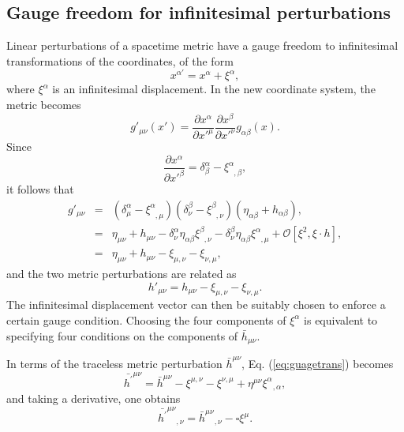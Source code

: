 \documentclass[12pt]{article}
\begin{document}
{\subsection{Gauge freedom for infinitesimal perturbations}Linear perturbations of a spacetime metric have a gauge freedom to infinitesimal transformations of the coordinates,
of the form
\begin{equation}
x^{\alpha '}=x^{\alpha}+\xi^{\alpha},
\end{equation}
where $\xi^\alpha$ is an infinitesimal displacement. In the new coordinate system, the metric becomes
\begin{equation}
g'_{\mu\nu}(x')=\frac{\partial x^{\alpha}}{\partial x'^{\mu}} \frac{\partial
x^{\beta}}{\partial x'^{\nu}} g_{\alpha\beta}(x).
\end{equation}
Since
\begin{equation}
\frac{\partial x^{\alpha}}{\partial x'^{\beta}}=\delta_{\beta}^{\alpha}-\xi^{\alpha}_{\phantom{\alpha},\beta},
\end{equation}
it follows that
\begin{eqnarray}
g'_{\mu\nu} & = & (\delta_{\mu}^{\alpha}-\xi^{\alpha}_{\phantom{\alpha},\mu})(\delta_{\nu}^{\beta}-\xi^{\beta}_{\phantom{\beta},\nu})(\eta_{\alpha\beta}+h_{\alpha\beta}),\nonumber\\
& = & \eta_{\mu\nu}+h_{\mu\nu}-\delta_{\nu}^{\alpha}\eta_{\alpha\beta}\xi^{\beta}_{\phantom{\beta},\nu}-\delta_{\nu}^{\beta}\eta_{\alpha\beta}\xi^{\alpha}_{\phantom{\alpha},\mu}+\mathscr{O}[\xi^{2},\xi
\cdot h],\nonumber\\
& = & \eta_{\mu\nu}+h_{\mu\nu}-\xi_{\mu,\nu}-\xi_{\nu,\mu},
\end{eqnarray}
and the two metric perturbations are related as
\begin{equation}
h'_{\mu\nu}=h_{\mu\nu}-\xi_{\mu,\nu}-\xi_{\nu,\mu}.
\label{eq:guagetrans}
\end{equation}
The infinitesimal displacement vector can then be suitably chosen to enforce a certain gauge condition. Choosing the four components of $\xi^\alpha$ is equivalent to specifying four conditions on the components of $\bar{h}_{\mu\nu}$. 

In terms of the traceless metric perturbation $\bar{h}^{\mu \nu}$, Eq. (\ref{eq:guagetrans}) becomes
\begin{equation}
\bar{h^{\prime}}^{\mu \nu}=\bar{h}^{\mu \nu}-\xi^{\mu, \nu}-\xi^{\nu, \mu}+\eta^{\mu
\nu} \xi^{\alpha}{}_{, \alpha},
\end{equation}
and taking a derivative, one obtains
\begin{equation}
\bar{h^{\prime}}^{\mu \nu}{}_{,\nu}=\bar{h}^{\mu \nu}{}_{,\nu}- \square\xi^{\mu}.
\end{equation}

}
\end{document}
